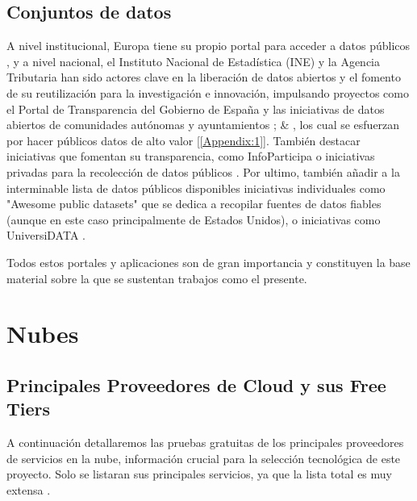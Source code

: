 	
	\subsection{Conjuntos de datos}
	
	A nivel institucional, Europa tiene su propio portal para acceder a datos públicos \citep{PortalDatosEuropa}, y a nivel nacional, el Instituto Nacional de Estadística (INE) y la Agencia Tributaria han sido actores clave en la liberación de datos abiertos y el fomento de su reutilización para la investigación e innovación, impulsando proyectos como el Portal de Transparencia del Gobierno de España y las iniciativas de datos abiertos de comunidades autónomas y ayuntamientos \citep{PortalDatosGob}; \citep{PortalDatosMadrid} \& \citep{PortalRegistradores}, los cual se esfuerzan por hacer públicos datos de alto valor [\ref{Appendix:1}]. También destacar iniciativas que fomentan su transparencia, como InfoParticipa \citep{PortalInfoparticipa} o iniciativas privadas para la recolección de datos públicos \citep{PortalEsriEspanna}. Por ultimo, también añadir a la interminable lista de datos públicos disponibles iniciativas individuales como "Awesome public datasets" \citep{awesomePublicDatasets} que se dedica a recopilar fuentes de datos fiables (aunque en este caso principalmente de Estados Unidos), o iniciativas como UniversiDATA \citep{UniversiDATA}.
	
	Todos estos portales y aplicaciones son de gran importancia y constituyen la base material sobre la que se sustentan trabajos como el presente.
	
\section{Nubes}


\subsection{Principales Proveedores de Cloud y sus Free Tiers}
\label{sec:cloud-free-tiers}

A continuación detallaremos las pruebas gratuitas de los principales proveedores de servicios en la nube, información crucial para la selección tecnológica de este proyecto. Solo se listaran sus principales servicios, ya que la lista total es muy extensa \citep{free-for-dev}.

